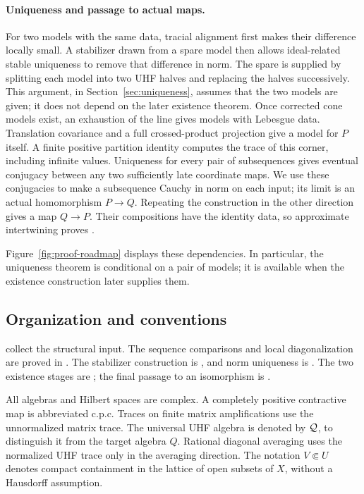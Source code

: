 \paragraph{Uniqueness and passage to actual maps.}
For two models with the same data, tracial alignment first makes their
difference locally small. A stabilizer drawn from a spare model then
allows ideal-related stable uniqueness to remove that difference in
norm. The spare is supplied by splitting each model into two UHF
halves and replacing the halves successively. This argument, in
Section~\ref{sec:uniqueness}, assumes that the two models are given;
it does not depend on the later existence theorem.
Once corrected cone models exist, an
exhaustion of the line gives models with Lebesgue data.
Translation covariance and a full crossed-product projection give
a model for \(P\) itself. A finite positive partition identity computes
the trace of this corner, including infinite values.
Uniqueness for every pair of subsequences gives eventual conjugacy
between any two sufficiently late coordinate maps. We use these
conjugacies to make a subsequence Cauchy in norm on each input; its
limit is an actual homomorphism $P\to Q$. Repeating the construction
in the other direction gives a map $Q\to P$. Their compositions have the
identity data, so approximate intertwining proves .

Figure~\ref{fig:proof-roadmap} displays these dependencies. In
particular, the uniqueness theorem is conditional on a pair of models;
it is available when the existence construction later supplies them.



\subsection{Organization and conventions}

 collect the structural input.
The sequence comparisons and local diagonalization are proved in
. The stabilizer construction is
, and norm uniqueness is
. The two existence stages are
; the final passage to an
isomorphism is .

All algebras and Hilbert spaces are complex. A completely positive
contractive map is abbreviated c.p.c. Traces on finite matrix
amplifications use the unnormalized matrix trace.
The universal UHF algebra is denoted by \(\mathcal Q\), to distinguish it
from the target algebra \(Q\). Rational diagonal averaging uses the
normalized UHF trace only in the averaging direction.
The notation \(V\Subset U\) denotes compact containment in the
lattice of open subsets of \(X\), without a Hausdorff assumption.
